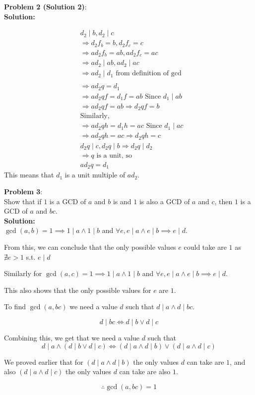 \documentclass[11pt]{article}
\newcommand{\prob}[3]{\begin{flushleft}
        \textbf{Problem #1}: \\
        #2 
		\textbf{Solution:} 
		#3

\end{flushleft}}
\begin{document}
\prob{2 (Solution 2)}{}
{
\begin{align*}
&d_2 \mid b, d_2 \mid c\\
&\Rightarrow d_2f_b = b, d_2f_c = c\\
&\Rightarrow ad_2f_b = ab, ad_2f_c = ac\\
&\Rightarrow ad_2 \mid ab, ad_2 \mid ac\\
&\Rightarrow ad_2 \mid d_1 \text{ from definition of gcd}\\
&\\
&\Rightarrow ad_2q = d_1\\
&\Rightarrow ad_2qf = d_1f = ab \text{ Since $d_1 \mid ab$}\\
&\Rightarrow ad_2qf = ab \Rightarrow d_2qf = b\\
&\text{Similarly,}\\
&\Rightarrow ad_2qh = d_1h = ac \text{ Since $d_1 \mid ac$}\\
&\Rightarrow ad_2qh = ac \Rightarrow d_2qh = c\\
&d_2q \mid c, d_2q \mid b \Rightarrow d_2q \mid d_2\\
&\Rightarrow \text{$q$ is a unit, so}\\
&ad_2q = d_1
\end{align*}
This means that $d_1$ is a unit multiple of $ad_2$.
}


\prob{3}{
  Show that if $1$ is a GCD of $a$ and $b$ is and $1$ is also a GCD of $a$ and $c$, then $1$ is a GCD of $a$ and $bc$. \\
}{ \\
  $\gcd(a,b) = 1 \implies 1 \mid a \land 1 \mid b$ and $\forall e, e \mid a \land e \mid b \implies e \mid d$.

  From this, we can conclude that the only possible values $e$ could take are $1$ as $\nexists e > 1$ s.t. $e \mid d$

  Similarly for $\gcd(a,c) = 1 \implies 1 \mid a \land 1 \mid b$ and $\forall e, e \mid a \land e \mid b \implies e \mid d$.

  This also shows that the only possible values for $e$ are $1$.

  To find $\gcd(a, bc)$ we need a value $d$ such that $d \mid a \land d \mid bc$.

  $$d \mid bc \iff d \mid b \lor d \mid c$$

  Combining this, we get that we need a value $d$ such that
  $$d \mid a \land (d \mid b \lor d \mid c) \iff (d \mid a \land d \mid b) \lor (d \mid a \land d \mid c)$$

  We proved earlier that for $(d \mid a \land d \mid b)$ the only values $d$ can take are $1$, and also $(d \mid a \land d \mid c)$ the only values $d$ can take are also $1$.

  $$\therefore \gcd(a,bc) = 1$$
}
\end{document}
